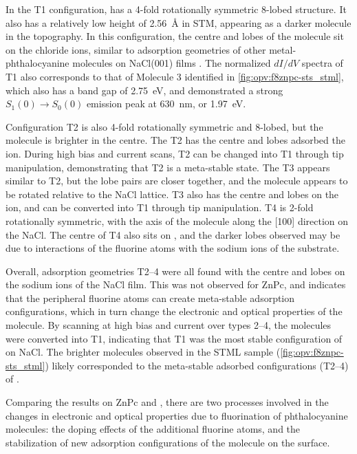 In the T1 configuration,  has a 4-fold rotationally symmetric 8-lobed structure. It also has a relatively low height of \SI{2.56}{\angstrom} in STM, appearing as a darker molecule in the topography. In this configuration, the centre and lobes of the molecule sit on the chloride ions, similar to adsorption geometries of other metal-phthalocyanine molecules on NaCl(001) films \citep{Miwa2016}. The normalized $dI/dV$ spectra of T1 also corresponds to that of Molecule 3 identified in \autoref{fig:opv:f8znpc-sts_stml}, which also has a band gap of \SI{2.75}{eV}, and demonstrated a strong $S_1(0) \rightarrow S_0(0)$ emission peak at \SI{630}{nm}, or \SI{1.97}{eV}. 

Configuration T2 is also 4-fold rotationally symmetric and 8-lobed, but the molecule is brighter in the centre. The T2  has the centre and lobes adsorbed the  ion. During high bias and current scans, T2  can be changed into T1 through tip manipulation, demonstrating that T2 is a meta-stable state. The T3  appears similar to T2, but the lobe pairs are closer together, and the molecule appears to be rotated relative to the NaCl lattice. T3 also has the centre and lobes on the  ion, and can be converted into T1 through tip manipulation. T4 is 2-fold rotationally symmetric, with the axis of the molecule along the [100] direction on the NaCl. The centre of T4 also sits on , and the darker lobes observed may be due to interactions of the fluorine atoms with the sodium ions of the substrate.

Overall, adsorption geometries T2--4 were all found with the centre and lobes on the sodium ions of the NaCl film. This was not observed for ZnPc, and indicates that the peripheral fluorine atoms can create meta-stable adsorption configurations, which in turn change the electronic and optical properties of the molecule. By scanning at high bias and current over types 2--4, the molecules were converted into T1, indicating that T1 was the most stable configuration of  on NaCl. The brighter molecules observed in the \ac{STML} sample (\autoref{fig:opv:f8znpc-sts_stml}) likely corresponded to the meta-stable  adsorbed configurations (T2--4) of . 

Comparing the results on ZnPc and , there are two processes involved in the changes in electronic and optical properties due to fluorination of phthalocyanine molecules: the doping effects of the additional fluorine atoms, and the stabilization of new adsorption configurations of the molecule on the surface.

